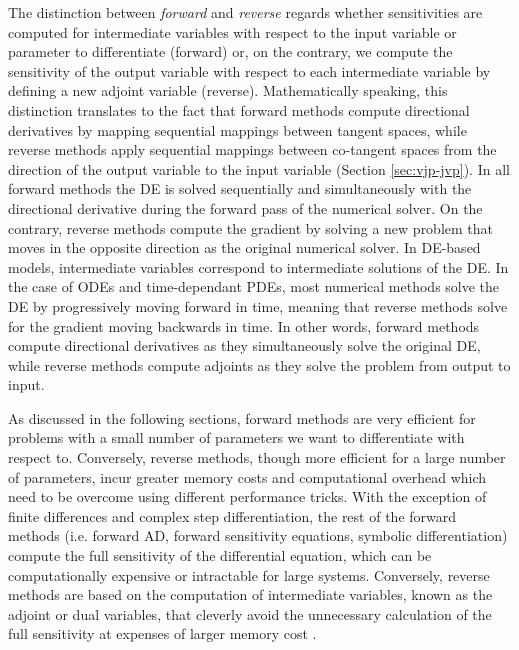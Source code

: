 The distinction between \textit{forward} and \textit{reverse} regards whether sensitivities are computed for intermediate variables with respect to the input variable or parameter to differentiate (forward) or, on the contrary, we compute the sensitivity of the output variable with respect to each intermediate variable by defining a new adjoint variable (reverse). 
Mathematically speaking, this distinction translates to the fact that forward methods compute directional derivatives by mapping sequential mappings between tangent spaces, while reverse methods apply sequential mappings between co-tangent spaces from the direction of the output variable to the input variable (Section \ref{sec:vjp-jvp}).   
In all forward methods the DE is solved sequentially and simultaneously with the directional derivative during the forward pass of the numerical solver. 
On the contrary, reverse methods compute the gradient by solving a new problem that moves in the opposite direction as the original numerical solver.
In DE-based models, intermediate variables correspond to intermediate solutions of the DE.
In the case of ODEs and time-dependant PDEs, most numerical methods solve the DE by progressively moving forward in time, meaning that reverse methods solve for the gradient moving backwards in time. 
In other words, forward methods compute directional derivatives as they simultaneously solve the original DE, while reverse methods compute adjoints as they solve the problem from output to input.

As discussed in the following sections, forward methods are very efficient for problems with a small number of parameters we want to differentiate with respect to. 
Conversely, reverse methods, though more efficient for a large number of parameters, incur greater memory costs and computational overhead which need to be overcome using different performance tricks. 
With the exception of finite differences and complex step differentiation, the rest of the forward methods (i.e. forward AD, forward sensitivity equations, symbolic differentiation) compute the full sensitivity of the differential equation, which can be computationally expensive or intractable for large systems. 
Conversely, reverse methods are based on the computation of intermediate variables, known as the adjoint or dual variables, that cleverly avoid the unnecessary calculation of the full sensitivity at expenses of larger memory cost \cite{Givoli_2021}. 

